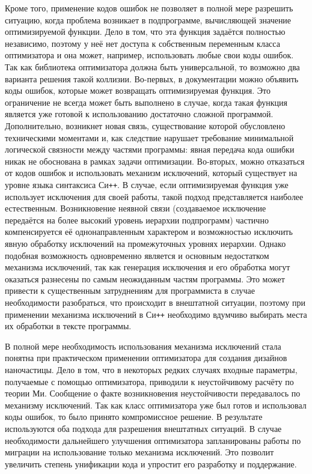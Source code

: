 Кроме того, применение кодов ошибок не позволяет в полной мере
разрешить ситуацию, когда проблема возникает в подпрограмме,
вычисляющей значение оптимизируемой функции. Дело в том, что эта
функция задаётся полностью независимо, поэтому у неё нет доступа к
собственным переменным класса оптимизатора и она может, например,
использовать любые свои коды ошибок. Так как библиотека оптимизатора
должна быть универсальной, то возможно два варианта решения такой
коллизии. Во-первых, в документации можно объявить коды ошибок,
которые может возвращать оптимизируемая функция. Это ограничение не
всегда может быть выполнено в случае, когда такая функция является
уже готовой к использованию достаточно сложной
программой. Дополнительно, возникнет новая связь, существование
которой обусловлено техническими моментами и, как следствие нарушает
требование минимальной логической связности между частями программы:
явная передача кода ошибки никак не обоснована в рамках задачи
оптимизации.  Во-вторых, можно отказаться от кодов ошибок и
использовать механизм исключений, который существует на уровне языка
синтаксиса Си\texttt{++}.  В случае, если оптимизируемая функция уже
использует исключения для своей работы, такой подход представляется
наиболее естественным.  Возникновение неявной связи (создаваемое
исключение передаётся на более высокий уровень иерархии подпрограмм)
частично компенсируется её однонаправленным характером и
возможностью исключить явную обработку исключений на промежуточных уровнях
иерархии.  Однако подобная возможность одновременно является и
основным недостатком механизма исключений, так как генерация
исключения и его обработка могут оказаться разнесены по самым
неожиданным частям программы.  Это может привести к существенным
затруднениям для программиста в случае необходимости разобраться, что
происходит в внештатной ситуации, поэтому при применении механизма
исключений в Си\texttt{++} необходимо вдумчиво выбирать места их
обработки в тексте программы.

В полной мере необходимость использования механизма исключений стала
понятна при практическом применении оптимизатора для создания дизайнов
наночастицы.  Дело в том, что в некоторых редких случаях входные
параметры, получаемые с помощью оптимизатора, приводили к
неустойчивому расчёту по теории Ми. Сообщение о факте возникновения
неустойчивости передавалось по механизму исключений. Так как класс
оптимизатора уже был готов и использовал коды ошибок, то было принято
компромиссное решение. В результате используются
оба подхода для разрешения внештатных ситуаций. В случае
необходимости дальнейшего улучшения оптимизатора запланированы работы
по миграции на использование только механизма исключений. Это позволит
увеличить степень унификации кода и упростит его разработку и
поддержание.

